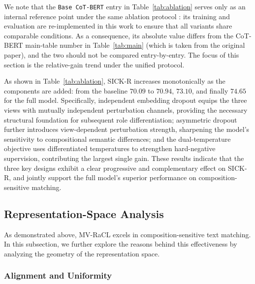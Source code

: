 \documentclass[lettersize,journal]{IEEEtran}
\begin{document}
We note that the \texttt{Base CoT-BERT} entry in Table~\ref{tab:ablation} serves only as an internal reference point under the same ablation protocol : its training and evaluation are re-implemented in this work to ensure that all variants share comparable conditions. As a consequence, its absolute value differs from the CoT-BERT main-table number in Table~\ref{tab:main} (which is taken from the original paper), and the two should not be compared entry-by-entry. The focus of this section is the relative-gain trend under the unified protocol.

As shown in Table~\ref{tab:ablation}, SICK-R increases monotonically as the components are added: from the baseline $70.09$ to $70.94$, $73.10$, and finally $74.65$ for the full model. Specifically, independent embedding dropout equips the three views with mutually independent perturbation channels, providing the necessary structural foundation for subsequent role differentiation; asymmetric dropout further introduces view-dependent perturbation strength, sharpening the model's sensitivity to compositional semantic differences; and the dual-temperature objective uses differentiated temperatures to strengthen hard-negative supervision, contributing the largest single gain. These results indicate that the three key designs exhibit a clear progressive and complementary effect on SICK-R, and jointly support the full model's superior performance on composition-sensitive matching.

\subsection{Representation-Space Analysis}
\label{subsec:repr}

As demonstrated above, MV-RaCL excels in composition-sensitive text matching. In this subsection, we further explore the reasons behind this effectiveness by analyzing the geometry of the representation space.

\subsubsection{Alignment and Uniformity}
\label{subsec:au}
\end{document}
